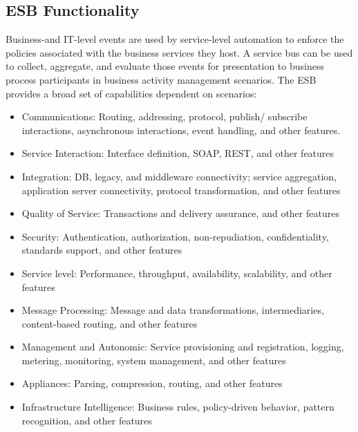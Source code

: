 \documentclass[12pt,a4paper,final,twoside,onecolumn,titlepage]{book}
\begin{document}
\subsection{ESB Functionality}
Business-and IT-level events are used by service-level automation to enforce the policies associated with the business services they host. A service bus can be used to collect, aggregate, and evaluate those events for presentation to business process participants in business activity management scenarios. The ESB provides a broad set of capabilities dependent on scenarios:
\begin{itemize}
\item Communications: Routing, addressing, protocol, publish/ subscribe interactions, asynchronous interactions, event handling, and other features.
\item Service Interaction: Interface definition, \gls{SOA}P, REST, and other features
\item Integration: \gls{DB}, legacy, and middleware connectivity; service aggregation, application server connectivity, protocol transformation, and other features
\item Quality of Service: Transactions and delivery assurance, and other features
\item Security: Authentication, authorization, non-repudiation, confidentiality, standards support, and other features
\item Service level: Performance, throughput, availability, scalability, and other features
\item Message Processing: Message and data transformations, intermediaries, content-based routing, and other features
\item Management and Autonomic: Service provisioning and registration, logging, metering, monitoring, system management, and other features
\item Appliances: Parsing, compression, routing, and other features
\item Infrastructure Intelligence: Business rules, policy-driven behavior, pattern recognition, and other features
\end{itemize}
\end{document}
